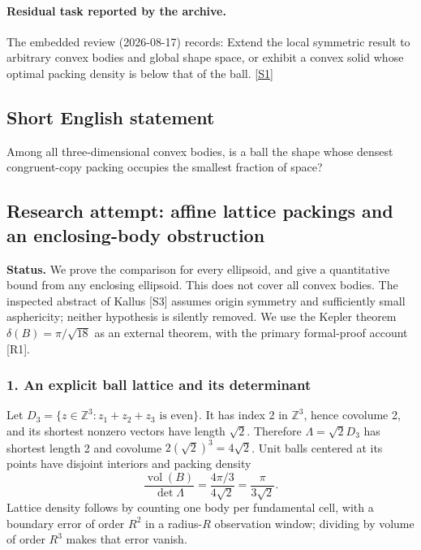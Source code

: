\documentclass[11pt,a4paper]{article}
\newcommand{\sref}[2]{\hyperlink{source:#1:#2}{[S#2]}}
\begin{document}
\paragraph{Residual task reported by the archive.}

The embedded review (2026-08-17) records: Extend the local symmetric result to arbitrary convex bodies and global shape space, or exhibit a convex solid whose optimal packing density is below that of the ball. \sref{1226}{1}

\subsection{Short English statement}

Among all three-dimensional convex bodies, is a ball the shape whose densest congruent-copy packing occupies the smallest fraction of space?

\subsection{Research attempt: affine lattice packings and an enclosing-body obstruction}
\textbf{Status.} We prove the comparison for every ellipsoid, and give a quantitative bound from any enclosing ellipsoid. This does not cover all convex bodies. The inspected abstract of Kallus [S3] assumes origin symmetry and sufficiently small asphericity; neither hypothesis is silently removed. We use the Kepler theorem $\delta(B)=\pi/\sqrt{18}$ as an external theorem, with the primary formal-proof account [R1].

\subsubsection{1. An explicit ball lattice and its determinant}
Let $D_3=\{z\in\mathbb Z^3:z_1+z_2+z_3\text{ is even}\}$. It has index 2 in $\mathbb Z^3$, hence covolume 2, and its shortest nonzero vectors have length $\sqrt2$. Therefore $\Lambda=\sqrt2D_3$ has shortest length 2 and covolume $2(\sqrt2)^3=4\sqrt2$. Unit balls centered at its points have disjoint interiors and packing density
\[\frac{\operatorname{vol}(B)}{\det\Lambda}
=\frac{4\pi/3}{4\sqrt2}=\frac\pi{3\sqrt2}.\tag{1}\]
Lattice density follows by counting one body per fundamental cell, with a boundary error of order $R^2$ in a radius-$R$ observation window; dividing by volume of order $R^3$ makes that error vanish.
\end{document}
